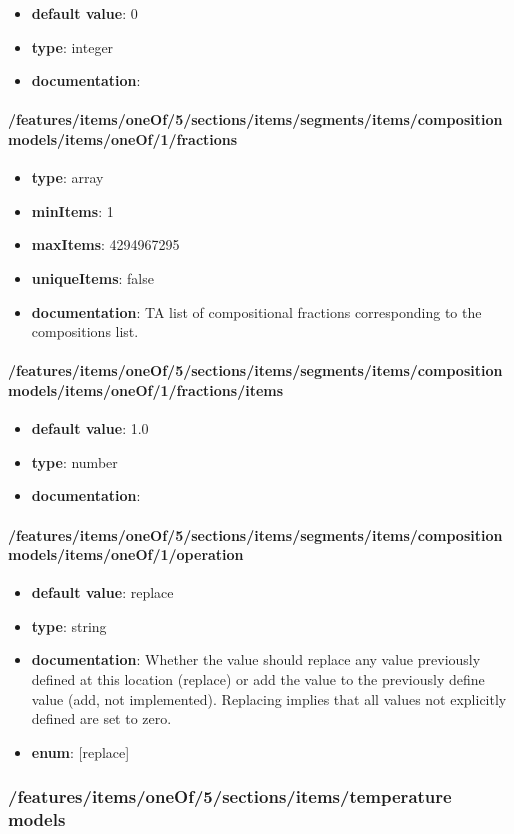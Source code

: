\begin{itemize}\item {\bf default value}: 0
\item {\bf type}: integer
\item {\bf documentation}: 
\end{itemize}\paragraph{/features/items/oneOf/5/sections/items/segments/items/composition models/items/oneOf/1/fractions}
\begin{itemize}\item {\bf type}: array
\item {\bf minItems}: 1
\item {\bf maxItems}: 4294967295
\item {\bf uniqueItems}: false
\item {\bf documentation}: TA list of compositional fractions corresponding to the compositions list.
\end{itemize}\paragraph{/features/items/oneOf/5/sections/items/segments/items/composition models/items/oneOf/1/fractions/items}
\begin{itemize}\item {\bf default value}: 1.0
\item {\bf type}: number
\item {\bf documentation}: 
\end{itemize}\paragraph{/features/items/oneOf/5/sections/items/segments/items/composition models/items/oneOf/1/operation}
\begin{itemize}\item {\bf default value}: replace
\item {\bf type}: string
\item {\bf documentation}: Whether the value should replace any value previously defined at this location (replace) or add the value to the previously define value (add, not implemented). Replacing implies that all values not explicitly defined are set to zero.
\item {\bf enum}: [replace]\end{itemize}\subsubsection{/features/items/oneOf/5/sections/items/temperature models}
